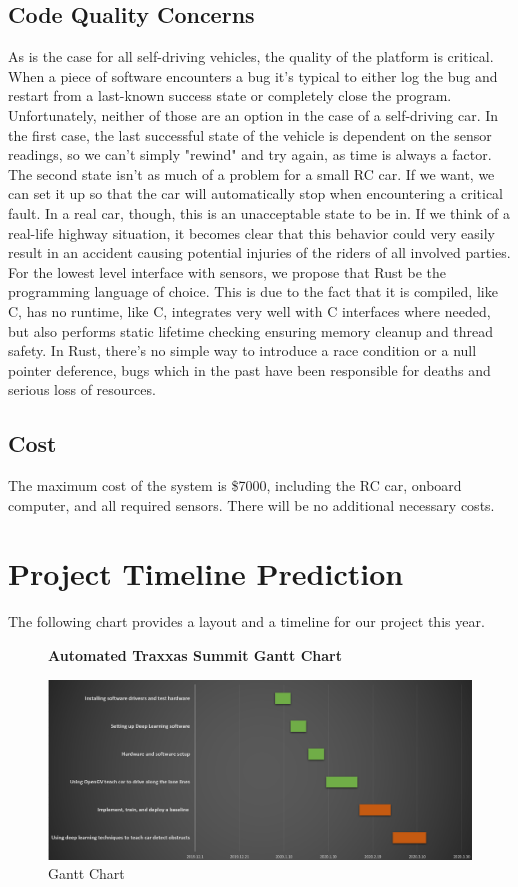 \documentclass[onecolumn, draftclsnofoot,10pt]{IEEEtran}
\begin{document}
\subsection{Code Quality Concerns}
    As is the case for all self-driving vehicles, the quality of the platform is critical. When a piece of software encounters a bug it's typical to either log the bug and restart from a last-known success state or completely close the program. Unfortunately, neither of those are an option in the case of a self-driving car. In the first case, the last successful state of the vehicle is dependent on the sensor readings, so we can't simply "rewind" and try again, as time is always a factor. The second state isn't as much of a problem for a small RC car. If we want, we can set it up so that the car will automatically stop when encountering a critical fault. In a real car, though, this is an unacceptable state to be in. If we think of a real-life highway situation, it becomes clear that this behavior could very easily result in an accident causing potential injuries of the riders of all involved parties. For the lowest level interface with sensors, we propose that Rust be the programming language of choice. This is due to the fact that it is compiled, like C, has no runtime, like C, integrates very well with C interfaces where needed, but also performs static lifetime checking ensuring memory cleanup and thread safety. In Rust, there's no simple way to introduce a race condition or a null pointer deference, bugs which in the past have been responsible for deaths and serious loss of resources.
    
\bigskip

\subsection{Cost}
The maximum cost of the system is \$7000, including the RC car, onboard computer, and all required sensors. There will be no additional necessary costs.


\section{Project Timeline Prediction}
The following chart provides a layout and a timeline for our project this year.
\begin{figure}[H]
  \centering
   \textbf{Automated Traxxas Summit Gantt Chart}\par\medskip
    \includegraphics[width=\linewidth]{gantt.png}
    \caption{Gantt Chart}
\end{figure}
\end{document}
